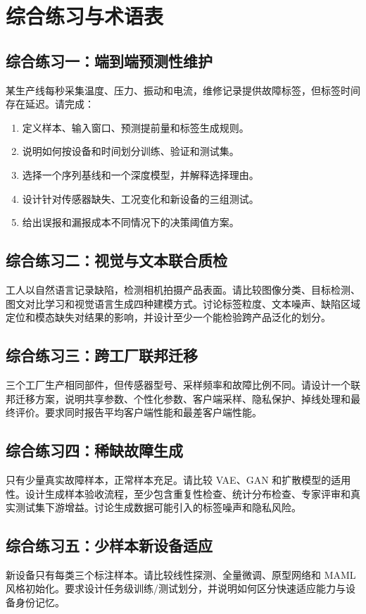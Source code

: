 \chapter{综合练习与术语表}

\section{综合练习一：端到端预测性维护}
某生产线每秒采集温度、压力、振动和电流，维修记录提供故障标签，但标签时间存在延迟。请完成：
\begin{enumerate}[label=\arabic*.]
 \item 定义样本、输入窗口、预测提前量和标签生成规则。
 \item 说明如何按设备和时间划分训练、验证和测试集。
 \item 选择一个序列基线和一个深度模型，并解释选择理由。
 \item 设计针对传感器缺失、工况变化和新设备的三组测试。
 \item 给出误报和漏报成本不同情况下的决策阈值方案。
\end{enumerate}

\section{综合练习二：视觉与文本联合质检}
工人以自然语言记录缺陷，检测相机拍摄产品表面。请比较图像分类、目标检测、图文对比学习和视觉语言生成四种建模方式。讨论标签粒度、文本噪声、缺陷区域定位和模态缺失对结果的影响，并设计至少一个能检验跨产品泛化的划分。

\section{综合练习三：跨工厂联邦迁移}
三个工厂生产相同部件，但传感器型号、采样频率和故障比例不同。请设计一个联邦迁移方案，说明共享参数、个性化参数、客户端采样、隐私保护、掉线处理和最终评价。要求同时报告平均客户端性能和最差客户端性能。

\section{综合练习四：稀缺故障生成}
只有少量真实故障样本，正常样本充足。请比较 VAE、GAN 和扩散模型的适用性。设计生成样本验收流程，至少包含重复性检查、统计分布检查、专家评审和真实测试集下游增益。讨论生成数据可能引入的标签噪声和隐私风险。

\section{综合练习五：少样本新设备适应}
新设备只有每类三个标注样本。请比较线性探测、全量微调、原型网络和 MAML 风格初始化。要求设计任务级训练/测试划分，并说明如何区分快速适应能力与设备身份记忆。

